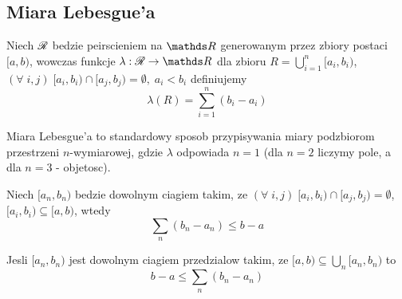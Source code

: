 \bigskip

\subsection{Miara Lebesgue'a}

\begin{multicols}{2}

    Niech $\mathcal{R}$ bedzie peirscieniem na $\R$ generowanym przez zbiory postaci $[a, b)$, wowczas funkcje $\lambda:\rodz R\to\R$ dla zbioru $R=\bigcup\limits_{i=1}^n[a_i,b_i)$, $(\forall\;i,j)\;[a_i,b_i)\cap[a_j, b_j)=\emptyset,\;a_i<b_i$ definiujemy
    $$\lambda(R)=\sum\limits_{i=1}^n(b_i-a_i)$$
    
    {\color{def}Miara Lebesgue'a} to standardowy sposob przypisywania miary podzbiorom przestrzeni $n$-wymiarowej, gdzie $\lambda$ odpowiada $n=1$ (dla $n=2$ liczymy pole, a dla $n=3$ - objetosc).\medskip

    Niech $[a_n,b_n)$ bedzie dowolnym ciagiem takim, ze $(\forall\;i, j)\;[a_i,b_i)\cap[a_j,b_j)=\emptyset$, \\$[a_i,b_i)\subseteq[a,b)$, wtedy
    $$\sum_n(b_n-a_n)\leq b-a$$

    Jesli $[a_n,b_n)$ jest dowolnym ciagiem przedzialow takim, ze $[a,b)\subseteq \bigcup_n[a_n,b_n)$ to
    $$b-a\leq \sum_n(b_n-a_n)$$
    
\end{multicols}